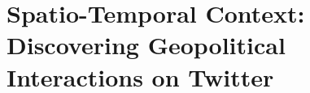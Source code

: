\chapter[Spatio-Temporal Context: Discovering Geopolitical Interactions on Twitter]{Spatio-Temporal Context: Discovering Geopolitical Interactions on Twitter\raisebox{.3\baselineskip}{\normalsize\footnotemark}}
\label{chapter:geopolitical}







 